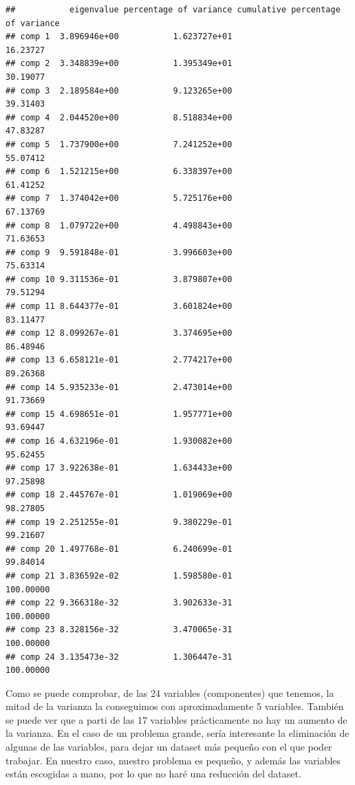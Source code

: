 \documentclass[]{article}
\begin{document}
\begin{verbatim}
##           eigenvalue percentage of variance cumulative percentage of variance
## comp 1  3.896946e+00           1.623727e+01                          16.23727
## comp 2  3.348839e+00           1.395349e+01                          30.19077
## comp 3  2.189584e+00           9.123265e+00                          39.31403
## comp 4  2.044520e+00           8.518834e+00                          47.83287
## comp 5  1.737900e+00           7.241252e+00                          55.07412
## comp 6  1.521215e+00           6.338397e+00                          61.41252
## comp 7  1.374042e+00           5.725176e+00                          67.13769
## comp 8  1.079722e+00           4.498843e+00                          71.63653
## comp 9  9.591848e-01           3.996603e+00                          75.63314
## comp 10 9.311536e-01           3.879807e+00                          79.51294
## comp 11 8.644377e-01           3.601824e+00                          83.11477
## comp 12 8.099267e-01           3.374695e+00                          86.48946
## comp 13 6.658121e-01           2.774217e+00                          89.26368
## comp 14 5.935233e-01           2.473014e+00                          91.73669
## comp 15 4.698651e-01           1.957771e+00                          93.69447
## comp 16 4.632196e-01           1.930082e+00                          95.62455
## comp 17 3.922638e-01           1.634433e+00                          97.25898
## comp 18 2.445767e-01           1.019069e+00                          98.27805
## comp 19 2.251255e-01           9.380229e-01                          99.21607
## comp 20 1.497768e-01           6.240699e-01                          99.84014
## comp 21 3.836592e-02           1.598580e-01                         100.00000
## comp 22 9.366318e-32           3.902633e-31                         100.00000
## comp 23 8.328156e-32           3.470065e-31                         100.00000
## comp 24 3.135473e-32           1.306447e-31                         100.00000
\end{verbatim}

Como se puede comprobar, de las 24 variables (componentes) que tenemos,
la mitad de la varianza la conseguimos con aproximadamente 5 variables.
También se puede ver que a parti de las 17 variables prácticamente no
hay un aumento de la varianza. En el caso de un problema grande, sería
interesante la eliminación de algunas de las variables, para dejar un
dataset más pequeño con el que poder trabajar. En nuestro caso, nuestro
problema es pequeño, y además las variables están escogidas a mano, por
lo que no haré una reducción del dataset.
\end{document}
